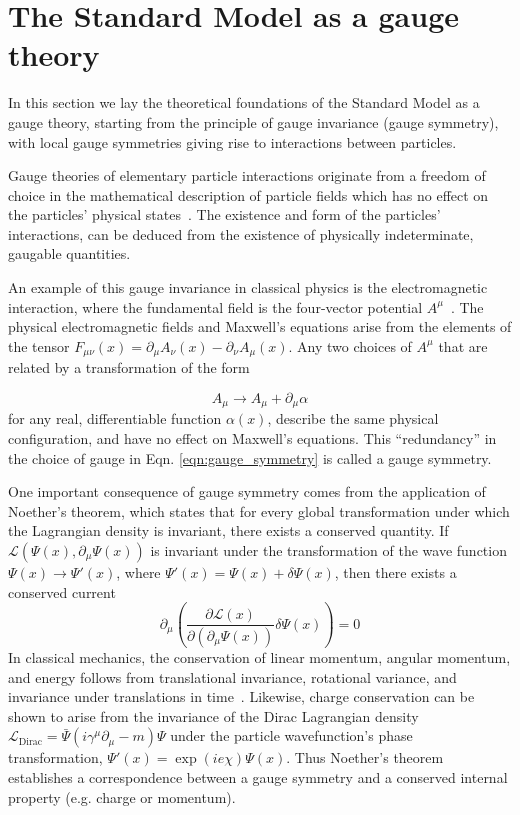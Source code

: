 \section{The Standard Model as a gauge theory}
\label{section:SM-as-gauge-theory} 
In this section we lay the theoretical foundations of the Standard Model as a gauge theory, starting from the principle of gauge invariance (gauge symmetry), with local gauge symmetries giving rise to interactions between particles.

Gauge theories of elementary particle interactions originate from a freedom of choice in the mathematical description of particle fields which has no effect on the particles' physical states~\cite{Tully+2012}. The existence and form of the particles' interactions, can be deduced from the existence of physically indeterminate, gaugable quantities.

An example of this gauge invariance in classical physics is the electromagnetic interaction, where the fundamental field is the four-vector potential $A^\mu$~\cite{Tully+2012}. The physical electromagnetic fields and Maxwell's equations arise from the elements of the tensor $F_{\mu\nu}(x) = \partial_\mu A_\nu (x) - \partial_\nu A_\mu (x)$. Any two choices of $A^\mu$ that are related by a transformation of the form

\begin{equation}
    A_\mu \rightarrow A_\mu + \partial_\mu \alpha
    \label{eqn:gauge_symmetry}
\end{equation} for any real, differentiable function $\alpha(x)$, describe the same physical configuration, and have no effect on Maxwell's equations. This ``redundancy'' in the choice of gauge in Eqn. \ref{eqn:gauge_symmetry} is called a gauge symmetry.

One important consequence of gauge symmetry comes from the application of Noether's theorem, which states that for every global transformation under which the Lagrangian density is invariant, there exists a conserved quantity. If $\mathcal{L}(\Psi(x), \partial_\mu \Psi(x))$ is invariant under the transformation of the wave function $\Psi(x) \rightarrow \Psi'(x)$, where $\Psi'(x) = \Psi(x) + \delta \Psi(x)$, then there exists a conserved current 
\begin{equation}
    \partial_\mu \left( \frac{\partial\mathcal{L}(x)}{\partial(\partial_\mu \Psi(x))} \delta \Psi(x)  \right) = 0
\end{equation}
In classical mechanics, the conservation of linear momentum, angular momentum, and energy follows from translational invariance, rotational variance, and invariance under translations in time~\cite{Tully+2012}. Likewise, charge conservation can be shown to arise from the invariance of the Dirac Lagrangian density $\mathcal{L}_{\text{Dirac}} = \bar{\Psi} (i\gamma^\mu \partial_\mu -m)\Psi$ under the particle wavefunction's phase transformation, $\Psi'(x) = \exp(ie\chi) \Psi(x)$. Thus Noether's theorem establishes a correspondence between a gauge symmetry and a conserved internal property (e.g. charge or momentum).

